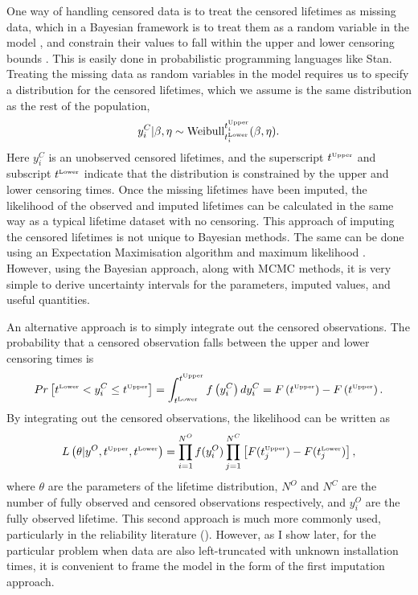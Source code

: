 One way of handling censored data is to treat the censored lifetimes as missing data, which in a Bayesian framework is to treat them as a random variable in the model \citep[p.211]{reich2019}, and constrain their values to fall within the upper and lower censoring bounds \citep{stan_user_guide2024}. This is easily done in probabilistic programming languages like Stan. Treating the missing data as random variables in the model requires us to specify a distribution for the censored lifetimes, which we assume is the same distribution as the rest of the population,
\begin{equation}
    \label{eq:impute-cens}
    y^C_i|\beta, \eta \sim \hbox{Weibull}^{t^{\hbox{\tiny{Upper}}}_i}_{t^{\hbox{\tiny{Lower}}}_i}(\beta, \eta).
\end{equation}
Here $y^C_i$ is an unobserved censored lifetimes, and the superscript $t^{\hbox{\tiny{Upper}}}$ and subscript $t^{\hbox{\tiny{Lower}}}$ indicate that the distribution is constrained by the upper and lower censoring times. Once the missing lifetimes have been imputed, the likelihood of the observed and imputed lifetimes can be calculated in the same way as a typical lifetime dataset with no censoring. This approach of imputing the censored lifetimes is not unique to Bayesian methods. The same can be done using an Expectation Maximisation algorithm and maximum likelihood \citep{mitra2013}. However, using the Bayesian approach, along with MCMC methods, it is very simple to derive uncertainty intervals for the parameters, imputed values, and useful quantities.

An alternative approach is to simply integrate out the censored observations. The probability that a censored observation falls between the upper and lower censoring times is
\begin{equation}
    \label{eq:integrate-out-cens}
    Pr\left[t^{\hbox{\tiny{Lower}}} < y^C_i \leq t^{\hbox{\tiny{Upper}}}\right] = \int_{t^{\hbox{\tiny{Lower}}}}^{t^{\hbox{\tiny{Upper}}}} f\left(y^C_i\right) d y^C_i = F\left(t^{\hbox{\tiny{Upper}}}\right) - F\left(t^{\hbox{\tiny{Upper}}}\right).
\end{equation}
By integrating out the censored observations, the likelihood can be written as
\begin{equation}
    \label{eq:censored_likelihood}
    L\left(\theta|y^O, t^{\hbox{\tiny{Upper}}}, t^{\hbox{\tiny{Lower}}}\right) = \prod^{N^O}_{i = 1}f(y^O_i) \prod^{N^C}_{j = 1}\left[F(t^{\hbox{\tiny{Upper}}}_j) - F(t^{\hbox{\tiny{Lower}}}_j)\right],
\end{equation}
where $\theta$ are the parameters of the lifetime distribution, $N^O$ and $N^C$ are the number of fully observed and censored observations respectively, and $y^O_i$ are the fully observed lifetime. This second approach is much more commonly used, particularly in the reliability literature (). However, as I show later, for the particular problem when data are also left-truncated with unknown installation times, it is convenient to frame the model in the form of the first imputation approach.

